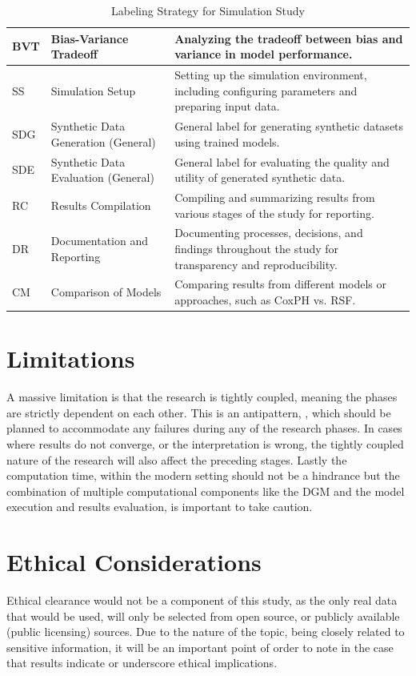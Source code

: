 \begin{table}[h!]
\begin{tabular}{|l|l|p{10cm}|}
    BVT  & Bias-Variance Tradeoff       & Analyzing the tradeoff between bias and variance in model performance. \\ \hline
    SS   & Simulation Setup             & Setting up the simulation environment, including configuring parameters and preparing input data. \\ \hline
    SDG  & Synthetic Data Generation (General) & General label for generating synthetic datasets using trained models. \\ \hline
    SDE  & Synthetic Data Evaluation (General) & General label for evaluating the quality and utility of generated synthetic data. \\ \hline
    RC   & Results Compilation          & Compiling and summarizing results from various stages of the study for reporting. \\ \hline
    DR   & Documentation and Reporting  & Documenting processes, decisions, and findings throughout the study for transparency and reproducibility. \\ \hline
    CM   & Comparison of Models         & Comparing results from different models or approaches, such as CoxPH vs. RSF. \\ \hline
    \end{tabular}
    \caption{Labeling Strategy for Simulation Study}
    \label{tab:labeling_strategy}
    \end{table}
    

\section{Limitations} \label{methlim}
A massive limitation is that the research is tightly coupled, meaning the phases are strictly dependent on each other. This is an antipattern, \parencite{joshi_beginning_2016}, which should be planned to accommodate any failures during any of the research phases. In cases where results do not converge, or the interpretation is wrong, the tightly coupled nature of the research will also affect the preceding stages. Lastly the computation time, within the modern setting should not be a hindrance but the combination of multiple computational components like the DGM and the model execution and results evaluation, is important to take caution. 

\section{Ethical Considerations}
Ethical clearance would not be a component of this study, as the only real data that would be used, will only be selected from open source, or publicly available (public licensing) sources. Due to the nature of the topic, being closely related to sensitive information, it will be an important point of order to note in the case that results indicate or underscore ethical implications.
